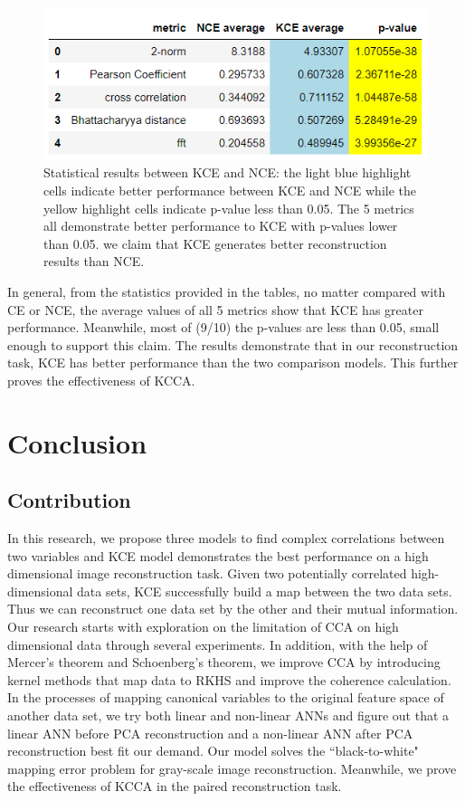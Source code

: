 \documentclass[12pt]{report} %
\begin{document}
\begin{figure}[H]
	\centering
	\includegraphics[scale=1.2]{pictures/KE-M2.png}
	\caption{Statistical results between KCE and NCE: the light blue highlight cells indicate better performance between KCE and NCE while the yellow highlight cells indicate p-value less than 0.05. The 5 metrics all demonstrate better performance to KCE with p-values lower than 0.05. we claim that KCE generates better reconstruction results than NCE.}
	\label{fig:7}
\end{figure}
In general, from the statistics provided in the tables, no matter compared with CE or NCE, the average values of all 5 metrics show that KCE has greater performance. Meanwhile, most of (9/10) the p-values are less than 0.05, small enough to support this claim. The results demonstrate that in our reconstruction task, KCE has better performance than the two comparison models. This further proves the effectiveness of KCCA. 

\chapter{Conclusion}
\section{Contribution}
In this research, we propose three models to find complex correlations between two variables and KCE model demonstrates the best performance on a high dimensional image reconstruction task. Given two potentially correlated high-dimensional data sets, KCE successfully build a map between the two data sets. Thus we can reconstruct one data set by the other and their mutual information. Our research starts with exploration on the limitation of CCA on high dimensional data through several experiments. In addition, with the help of Mercer's theorem and Schoenberg's theorem, we improve CCA by introducing kernel methods that map data to RKHS and improve the coherence calculation. In the processes of mapping canonical variables to the original feature space of another data set, we try both linear and non-linear ANNs and figure out that a linear ANN before PCA reconstruction and a non-linear ANN after PCA reconstruction best fit our demand. Our model solves the ``black-to-white" mapping error problem for gray-scale image reconstruction. Meanwhile, we prove the effectiveness of KCCA in the paired reconstruction task.
\end{document}
